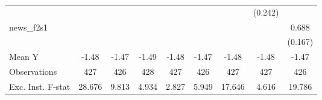 {\begin{tabular}{l*{8}{c}}
            &                     &                     &                     &                     &                     &                     &     (0.242)         &                     \\
\addlinespace
news\_f2s1   &                     &                     &                     &                     &                     &                     &                     &       0.688\sym{***}\\
            &                     &                     &                     &                     &                     &                     &                     &     (0.167)         \\
\midrule
Mean Y      &       -1.48         &       -1.47         &       -1.49         &       -1.48         &       -1.47         &       -1.48         &       -1.48         &       -1.47         \\
Observations&         427         &         426         &         428         &         427         &         426         &         427         &         427         &         426         \\
Exc. Inst. F-stat&      28.676         &       9.813         &       4.934         &       2.827         &       5.949         &      17.646         &       4.616         &      19.786         \\
\bottomrule
\end{tabular}
}
